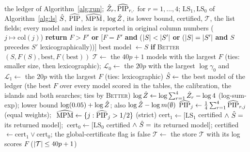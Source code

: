 \begin{algorithm}
\caption{Stage~7: the ledger, the reported model, pooling, the certification flag, the list $\mathcal T$ and the list-renormalised fields.}\label{alg:outputs}
{\footnotesize
\begin{algorithmic}[1]
\Require the ledger of Algorithm~\ref{alg:run}; $\hat Z_r,\widehat{\mathrm{PIP}}_{r,\cdot}$ for $r=1,\dots,4$; $\mathrm{LS}_1,\mathrm{LS}_0$ of Algorithm~\ref{alg:ls}
\Ensure $\hat S$, $\widehat{\mathrm{PIP}}$, $\widehat{\mathrm{MPM}}$, $\log\hat Z$, its lower bound, certified, $\mathcal T$, the list fields; every model and index is reported in original column numbers ($j\mapsto\mathrm{col}(j)$)
\State \textbf{return} $F>F'$ \textbf{or} [$F=F'$ \textbf{and} ($\lvert S\rvert<\lvert S'\rvert$ \textbf{or} ($\lvert S\rvert=\lvert S'\rvert$ \textbf{and} $S$ precedes $S'$ lexicographically))] %
\EndProcedure
{}
\State best model $\gets S$ \textbf{if} \textsc{Better}$(S,F(S),\text{best},F(\text{best}))$ %
\State $\mathcal T\gets$ the $40p+1$ models with the largest $F$ (ties: smaller size, then lexicographic); $\mathcal L_0\gets$ the $20p$ with the largest $\log\gamma_0$ and $\mathcal L_1\gets$ the $20p$ with the largest $F$ (ties: lexicographic) %
\EndProcedure
{}
\State $\hat S\gets$ the best model of the ledger (the best $F$ over every model scored in the tables, the calibration, the islands and both searches; ties by \textsc{Better}) %
\State $\log\hat Z\gets\log\sum_{r=1}^4\hat Z_r-\log4$ (log-sum-exp); lower bound $\log(0.05)+\log\hat Z$; also $\log\hat Z-\log m(\emptyset)$ %
\State $\widehat{\mathrm{PIP}}_j\gets\frac14\sum_{r=1}^4\widehat{\mathrm{PIP}}_{r,j}$ (equal weights); $\ \MPMhat\gets\{j:\PIPhat_j>1/2\}$ (strict) %
\State cert$_1\gets[\mathrm{LS}_1$ certified $\wedge\ \hat S=$ its returned model$]$; $\ \mathrm{cert}_0\gets[\mathrm{LS}_0$ certified $\wedge\ \hat S=$ its returned model$]$; certified $\gets\mathrm{cert}_1\vee\mathrm{cert}_0$; the global-certificate flag is false %
\State $\mathcal T\gets$ the store $\mathcal T$ with its log scores $F$ ($\lvert \mathcal T\rvert\le40p+1$) %

\end{algorithmic}}
\end{algorithm}
